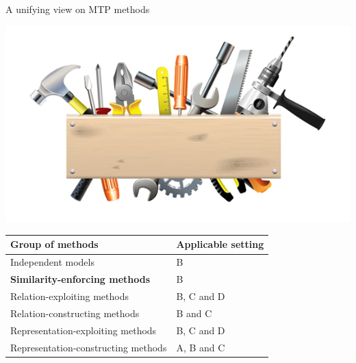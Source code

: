 \documentclass[]{beamer}
\renewcommand{\alert}[1]{\textbf{\color{putblue} #1}}
\begin{document}
\begin{frame}{A unifying view on MTP methods}

\begin{center}
\includegraphics[scale=0.3]{pics/tools}

\begin{tabular}{ll}
\hline
Group of methods & Applicable setting \\
\hline
\hline
Independent models & B \\
\alert{Similarity-enforcing methods} & B   \\ 
Relation-exploiting methods & B, C and D  \\
Relation-constructing methods & B and C \\
Representation-exploiting methods & B, C and D \\
Representation-constructing methods & A, B and C \\
\hline  
\end{tabular}
\end{center}
\end{frame}
\end{document}
